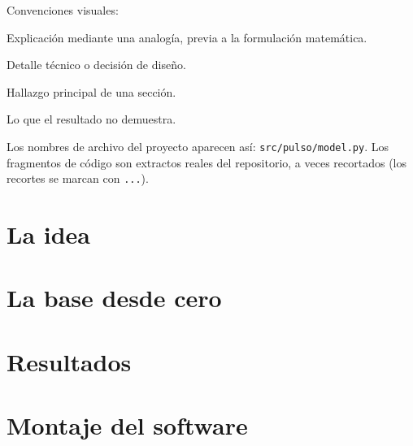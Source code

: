 \documentclass[11pt,a4paper,oneside]{book}
\newcommand{\archivo}[1]{\texttt{\color{azul}#1}}
\begin{document}
Convenciones visuales:
\begin{idea}[Intuición] Explicación mediante una analogía, previa a la formulación matemática.\end{idea}
\begin{nota}[Nota] Detalle técnico o decisión de diseño.\end{nota}
\begin{clave} Hallazgo principal de una sección.\end{clave}
\begin{limite} Lo que el resultado no demuestra.\end{limite}
Los nombres de archivo del proyecto aparecen así: \archivo{src/pulso/model.py}. Los
fragmentos de código son extractos reales del repositorio, a veces recortados
(los recortes se marcan con \texttt{...}).

\tableofcontents

\mainmatter
\part{La idea}

\part{La base desde cero}

\part{Resultados}

\part{Montaje del software}

\appendix

\end{document}
